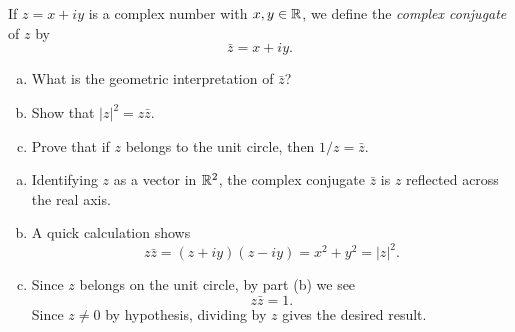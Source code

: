 \begin{exrc}[2]
    If \(z = x + iy\) is a complex number with \(x, y \in \mathbb{R}\),
    we define the \emph{complex conjugate} of \(z\) by
    \begin{equation*}
        \bar{z} = x + iy.
    \end{equation*}
    \begin{enumerate}[(a)]
    \item
        What is the geometric interpretation of \(\bar{z}\)?
    \item
        Show that \(|z|^2 = z \bar{z}\).
    \item
        Prove that if \(z\) belongs to the unit circle, then \(1 / z = \bar{z}\).
    \end{enumerate}

\begin{soln}
    \begin{enumerate}[(a)]
    \item
        Identifying \(z\) as a vector in \(\mathbb{R}^2\),
        the complex conjugate \(\bar{z}\)
        is \(z\) reflected across the real axis.
    \item
        A quick calculation shows
        \begin{equation*}
            z \bar{z} = (z + iy)(z - iy) = x^2 + y^2 = |z|^2.
        \end{equation*}
    \item
        Since \(z\) belongs on the unit circle,
        by part (b) we see
        \begin{equation*}
            z \bar{z} = 1.
        \end{equation*}
        Since \(z \neq 0\) by hypothesis,
        dividing by \(z\) gives the desired result.
    \end{enumerate}

\end{soln}
\end{exrc}

